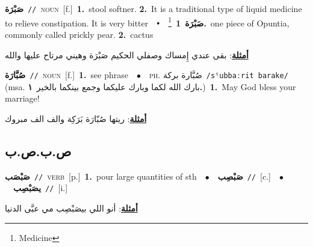 \documentclass[10pt,a4paper,twoside]{article} %
\begin{document}
\begin{multicols}{2}
{\setlength\topsep{0pt}\textbf{\foreignlanguage{arabic}{صَبْرَة}}\ {\color{gray}\texttt{//}\color{black}}\ \textsc{noun}\ [f.]\ \textbf{1.}~stool softner.  \textbf{2.}~It is a traditional type of  liquid medicine to relieve constipation. It is very bitter\ \ $\smblkdiamond$\ \ \setlength\topsep{0pt}\textbf{\foreignlanguage{arabic}{صَبْرَة}}\ \footnote{Medicine}\ \textbf{1.}~one piece of Opuntia, commonly called prickly pear.  \textbf{2.}~cactus\  \begin{flushright}\color{gray}\foreignlanguage{arabic}{\textbf{\underline{\foreignlanguage{arabic}{أمثلة}}}: بقى عندي إِمساك وصفلي الحكيم صَبْرَة وهيني مرتاح عليها والله}\end{flushright}\color{black}} \vspace{2mm}

{\setlength\topsep{0pt}\textbf{\foreignlanguage{arabic}{صُبَّارَة}}\ {\color{gray}\texttt{//}\color{black}}\ \textsc{noun}\ [f.]\ \textbf{1.}~see phrase\ \ $\bullet$\ \ \textsc{ph.} \color{gray} \foreignlanguage{arabic}{صُبَّارة بركة}\color{black}\ {\color{gray}\texttt{/{\sffamily sˤubbaːrit barake}/}\color{black}}\ \color{gray} (msa. \foreignlanguage{arabic}{بارك الله لكما وبارك عليكما وجمع بينكما بالخير}~\foreignlanguage{arabic}{\textbf{١.}})\color{black}\ \textbf{1.}~May God bless your marriage!\  \begin{flushright}\color{gray}\foreignlanguage{arabic}{\textbf{\underline{\foreignlanguage{arabic}{أمثلة}}}: ريتها صُبّارَة بَرَكِة والف الف مبروك}\end{flushright}\color{black}} \vspace{2mm}

\vspace{-3mm}
\subsection*{\color{blue}\foreignlanguage{arabic}{ص.ب.ص.ب}\color{blue}{}} 

{\setlength\topsep{0pt}\textbf{\foreignlanguage{arabic}{صَبْصَب}}\ {\color{gray}\texttt{//}\color{black}}\ \textsc{verb}\ [p.]\ \textbf{1.}~pour large quantities of sth\ \ $\bullet$\ \ \setlength\topsep{0pt}\textbf{\foreignlanguage{arabic}{صَبْصِب}}\ {\color{gray}\texttt{//}\color{black}}\ [c.]\ \ $\bullet$\ \ \setlength\topsep{0pt}\textbf{\foreignlanguage{arabic}{يصَبْصِب}}\ {\color{gray}\texttt{//}\color{black}}\ [i.]\  \begin{flushright}\color{gray}\foreignlanguage{arabic}{\textbf{\underline{\foreignlanguage{arabic}{أمثلة}}}: أنو اللي بيصَبْصِب مي عبَّى الدنيا}\end{flushright}\color{black}} \vspace{2mm}


\end{multicols}
\end{document}
